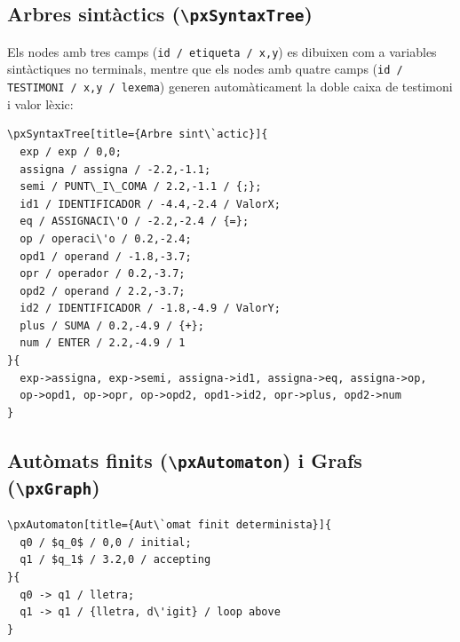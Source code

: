 \documentclass[11pt,a4paper]{article}
\begin{document}
\subsection{Arbres sint\`actics (\texttt{\textbackslash pxSyntaxTree})}
Els nodes amb tres camps (\texttt{id / etiqueta / x,y}) es dibuixen com a variables sint\`actiques
no terminals, mentre que els nodes amb quatre camps (\texttt{id / TESTIMONI / x,y / lexema})
generen autom\`aticament la doble caixa de testimoni i valor l\`exic:

\begin{verbatim}
\pxSyntaxTree[title={Arbre sint\`actic}]{
  exp / exp / 0,0;
  assigna / assigna / -2.2,-1.1;
  semi / PUNT\_I\_COMA / 2.2,-1.1 / {;};
  id1 / IDENTIFICADOR / -4.4,-2.4 / ValorX;
  eq / ASSIGNACI\'O / -2.2,-2.4 / {=};
  op / operaci\'o / 0.2,-2.4;
  opd1 / operand / -1.8,-3.7;
  opr / operador / 0.2,-3.7;
  opd2 / operand / 2.2,-3.7;
  id2 / IDENTIFICADOR / -1.8,-4.9 / ValorY;
  plus / SUMA / 0.2,-4.9 / {+};
  num / ENTER / 2.2,-4.9 / 1
}{
  exp->assigna, exp->semi, assigna->id1, assigna->eq, assigna->op,
  op->opd1, op->opr, op->opd2, opd1->id2, opr->plus, opd2->num
}
\end{verbatim}


\subsection{Aut\`omats finits (\texttt{\textbackslash pxAutomaton}) i Grafs (\texttt{\textbackslash pxGraph})}
\begin{verbatim}
\pxAutomaton[title={Aut\`omat finit determinista}]{
  q0 / $q_0$ / 0,0 / initial;
  q1 / $q_1$ / 3.2,0 / accepting
}{
  q0 -> q1 / lletra;
  q1 -> q1 / {lletra, d\'igit} / loop above
}
\end{verbatim}

\end{document}
